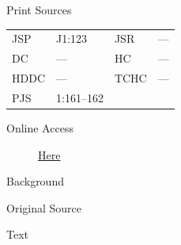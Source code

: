 			\begin{description}
				\item[Print Sources]
			\end{description}

				\begin{tabular}{p{0.5in}p{1in}p{0.5in}p{1in}}
				JSP	 	& J1:123		& JSR 		& --- \\
				DC	 	& --- 				& HC 		& --- \\
				HDDC 	& ---				& TCHC 		& --- \\
				PJS 	& 1:161--162			& 	 		&  \\
				\end{tabular}
			
			\begin{description}
				\item[Online Access] \href{https://www.josephsmithpapers.org/paper-summary/journal-1835-1836/68}{Here}
			\end{description}
			
			\begin{description}
				\item[Background]
			\end{description}
			
			
			\begin{description}
				\item[Original Source]
			\end{description}
			
			
			\begin{description}
				\item[Text]
			\end{description}
			

